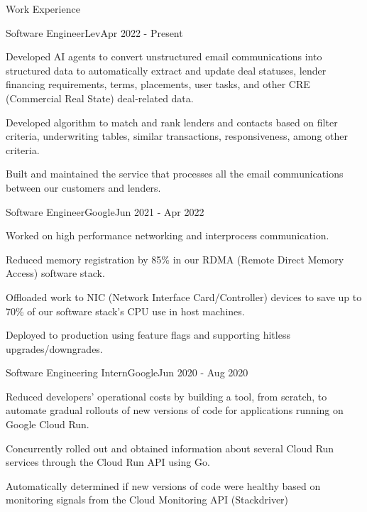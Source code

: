 \documentclass{resume} %
\begin{document}

\begin{rSection}{Work Experience}
	
\begin{rSubsection}{Software Engineer}{Lev}{}{Apr 2022 - Present}
	\item Developed AI agents to convert unstructured email communications into structured data to automatically extract and update deal statuses, lender financing requirements, terms, placements, user tasks, and other CRE (Commercial Real State) deal-related data.
	\item Developed algorithm to match and rank lenders and contacts based on filter criteria, underwriting tables, similar transactions, responsiveness, among other criteria.
	\item Built and maintained the service that processes all the email communications between our customers and lenders.
\end{rSubsection}
	
\begin{rSubsection}{Software Engineer}{Google}{}{Jun 2021 - Apr 2022}
	\item Worked on high performance networking and interprocess communication.
	\item Reduced memory registration by 85\% in our RDMA (Remote Direct Memory Access) software stack.
	\item Offloaded work to NIC (Network Interface Card/Controller) devices to save up to 70\% of our software stack’s CPU use in	host machines.
	\item Deployed to production using feature flags and supporting hitless upgrades/downgrades.
\end{rSubsection}

\begin{rSubsection}{Software Engineering Intern}{Google}{}{Jun 2020 - Aug 2020}
\item Reduced developers' operational costs by building a tool, from scratch, to automate gradual rollouts of new versions of code for applications running on Google Cloud Run.
\item Concurrently rolled out and obtained information about several Cloud Run services through the Cloud Run API using Go.
\item Automatically determined if new versions of code were healthy based on monitoring signals from the Cloud Monitoring API (Stackdriver)
\end{rSubsection}


\end{rSection}
\end{document}
